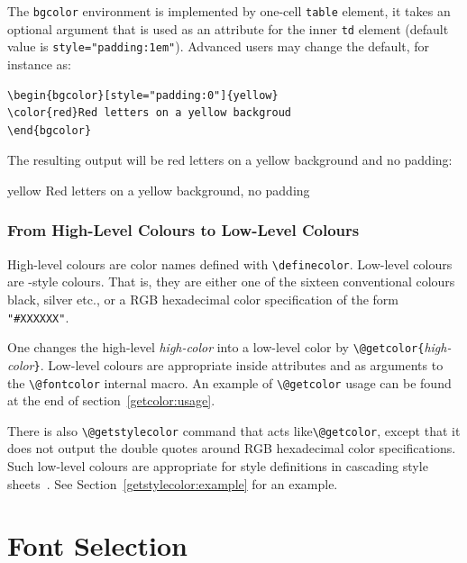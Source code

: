 The \texttt{bgcolor} environment is implemented by one-cell
\verb+table+ element, it takes an
optional argument that is used as an attribute for the inner \verb+td+
element (default value is \verb+style="padding:1em"+).
Advanced users may change the default, for instance as:
\begin{verbatim}
\begin{bgcolor}[style="padding:0"]{yellow}
\color{red}Red letters on a yellow backgroud
\end{bgcolor}
\end{verbatim}
The resulting output will be red letters
on a yellow background and no padding:
\begin{htmlonly}
\begin{bgcolor}[style="padding:0"]{yellow}
\color{red}Red letters on a yellow background, no padding
\end{bgcolor}
\end{htmlonly}


\subsubsection{From High-Level Colours to Low-Level Colours}\label{getcolor}
High-level colours are color names
defined with \verb+\definecolor+.
Low-level colours are \html-style colours.
That is, they are either one of the sixteen conventional colours black,
silver etc., or a RGB hexadecimal color specification of the form
\verb+"#XXXXXX"+.


One changes the high-level \emph{high-color} into a low-level color by
\verb+\@getcolor{+\emph{high-color}\verb+}+.
Low-level colours are appropriate inside \html{} attributes and as
arguments to the \verb+\@fontcolor+ internal macro.
An example of \verb+\@getcolor+ usage can be found at the end of
section~\ref{getcolor:usage}.

There is also \verb+\@getstylecolor+ command that acts
like\verb+\@getcolor+, except that it does not output the double
quotes around RGB hexadecimal color specifications.
Such low-level colours are appropriate for style definitions in
cascading style sheets~\cite{css}. See
Section~\ref{getstylecolor:example} for an example.


\section{Font Selection}

